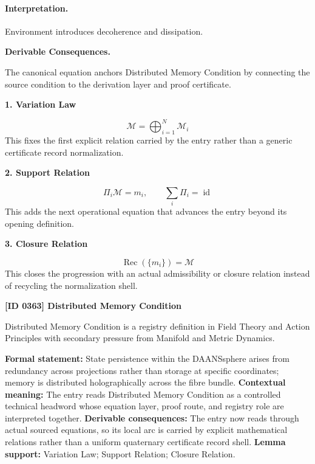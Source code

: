 \paragraph{Interpretation.}
Environment introduces decoherence and dissipation.

\par\vspace{0.35em}
\noindent\textbf{Derivable Consequences.}\quad
\begingroup
\footnotesize
\raggedright
The canonical equation anchors Distributed Memory Condition by connecting the source condition to the derivation layer and proof certificate.
\par\endgroup

\noindent\textbf{1. Variation Law}\par
\[
\mathcal{M}=\bigoplus_{i=1}^{N}\mathcal{M}_{i}
\]
\noindent This fixes the first explicit relation carried by the entry rather than a generic certificate record normalization.\par
\noindent\textbf{2. Support Relation}\par
\[
\Pi_{i}\mathcal{M}=m_{i},\qquad \sum_i \Pi_i=\operatorname{id}
\]
\noindent This adds the next operational equation that advances the entry beyond its opening definition.\par
\noindent\textbf{3. Closure Relation}\par
\[
\operatorname{Rec}(\{m_i\})=\mathcal{M}
\]
\noindent This closes the progression with an actual admissibility or closure relation instead of recycling the normalization shell.\par

\clearpage
\noindent\textbf{[ID 0363] Distributed Memory Condition}\par
\vspace{0.35em}
\begingroup\small
{}
Distributed Memory Condition is a registry definition in Field Theory and Action Principles with secondary pressure from Manifold and Metric Dynamics.

\begingroup\footnotesize\setlength{\emergencystretch}{3em}\sloppy
\textbf{Formal statement:} State persistence within the DAANSsphere arises from redundancy across projections rather than storage at specific coordinates; memory is distributed holographically across the fibre bundle. \textbf{Contextual meaning:} The entry reads Distributed Memory Condition as a controlled technical headword whose equation layer, proof route, and registry role are interpreted together. \textbf{Derivable consequences:} The entry now reads through actual sourced equations, so its local arc is carried by explicit mathematical relations rather than a uniform quaternary certificate record shell. \textbf{Lemma support:} Variation Law; Support Relation; Closure Relation.\par
\endgroup

